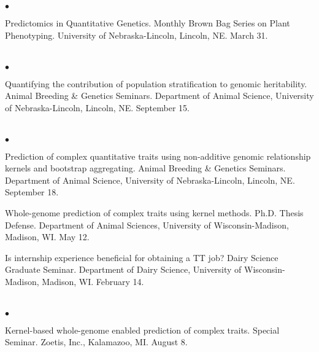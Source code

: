 \documentclass[margin,line,10pt]{res}
\newenvironment{list2}{
  \begin{list}{$\bullet$}{%
      \setlength{\itemsep}{0in}
      \setlength{\parsep}{0in} \setlength{\parskip}{0in}
      \setlength{\topsep}{0in} \setlength{\partopsep}{0in} 
      \setlength{\leftmargin}{0.2in}}}{\end{list}}
\begin{document}
\begin{resume}
\section{}
\begin{list2}
\item Predictomics in Quantitative Genetics. Monthly Brown Bag Series on Plant Phenotyping. University of Nebraska-Lincoln, Lincoln, NE. March 31. 
\end{list2}  

\section{}
\begin{list2}
\item  Quantifying the contribution of population stratification to genomic heritability. Animal Breeding \& Genetics Seminars. Department of Animal Science, University of Nebraska-Lincoln, Lincoln, NE. September 15. 
\end{list2}  

\section{}
\begin{list2}
\item  Prediction of complex quantitative traits using non-additive genomic relationship kernels and bootstrap aggregating. Animal Breeding \& Genetics Seminars. Department of Animal Science, University of Nebraska-Lincoln, Lincoln, NE. September 18. 
\vspace{0.5cm}

\item Whole-genome prediction of complex traits using kernel methods. Ph.D. Thesis Defense. Department of Animal Sciences, University of Wisconsin-Madison, Madison, WI. May 12. 
\vspace{0.5cm}

\item Is internship experience beneficial for obtaining a TT job? Dairy Science Graduate Seminar. Department of Dairy Science, University of Wisconsin-Madison, Madison, WI. February 14. 
\end{list2}  

\section{}
\begin{list2}
\item  Kernel-based whole-genome enabled prediction of complex traits. Special Seminar.  Zoetis, Inc., Kalamazoo, MI. August 8. 
\end{list2}  


\end{resume}
\end{document}
